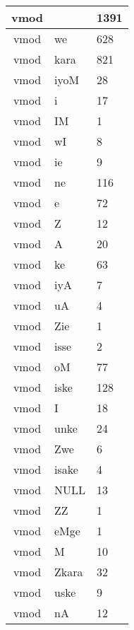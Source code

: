 \documentclass[a4 paper]{article}
\begin{document}
\begin{longtable}{cp{}p{}}
vmod &  & 1391\\ \midrule vmod & we & 628\\ \midrule vmod & kara & 821\\ \midrule vmod & iyoM & 28\\ \midrule vmod & i & 17\\ \midrule vmod & IM & 1\\ \midrule vmod & wI & 8\\ \midrule vmod & ie & 9\\ \midrule vmod & ne & 116\\ \midrule vmod & e & 72\\ \midrule vmod & Z & 12\\ \midrule vmod & A & 20\\ \midrule vmod & ke & 63\\ \midrule vmod & iyA & 7\\ \midrule vmod & uA & 4\\ \midrule vmod & Zie & 1\\ \midrule vmod & isse & 2\\ \midrule vmod & oM & 77\\ \midrule vmod & iske & 128\\ \midrule vmod & I & 18\\ \midrule vmod & unke & 24\\ \midrule vmod & Zwe & 6\\ \midrule vmod & isake & 4\\ \midrule vmod & NULL & 13\\ \midrule vmod & ZZ & 1\\ \midrule vmod & eMge & 1\\ \midrule vmod & M & 10\\ \midrule vmod & Zkara & 32\\ \midrule vmod & uske & 9\\ \midrule vmod & nA & 12\\
\end{longtable}
\end{document}
